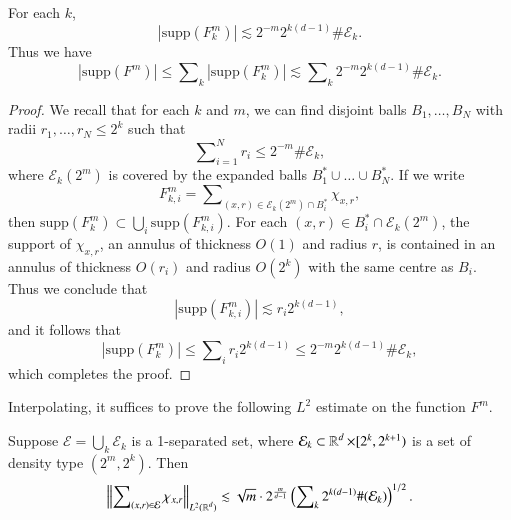 \begin{lemma} \label{lemma5}
    For each $k$,
    \[ |\text{supp}(F^m_k)| \lesssim 2^{-m} 2^{k(d-1)} \# \mathcal{E}_k. \]
    Thus we have
    \[ |\text{supp}(F^m)| \leq \sum\nolimits_k |\text{supp}(F^m_k)| \lesssim \sum\nolimits_k 2^{-m} 2^{k(d-1)} \# \mathcal{E}_k. \]
\end{lemma}
\begin{proof}
    We recall that for each $k$ and $m$, we can find disjoint balls $B_1,\dots,B_N$ with radii $r_1,\dots,r_N \leq 2^k$ such that
    \begin{equation}
      \sum\nolimits_{i = 1}^N r_i \leq 2^{-m} \# \mathcal{E}_k,
    \end{equation}
    where $\mathcal{E}_k(2^m)$ is covered by the expanded balls $B_1^* \cup \dots \cup B_N^*$. If we write
    \begin{equation}
      F^m_{k,i} = \sum\nolimits_{(x,r) \in \mathcal{E}_k(2^m) \cap B_i^*} \chi_{x,r},
    \end{equation}
    then $\text{supp}(F^m_k) \subset \bigcup_i \text{supp}(F^m_{k,i})$. For each $(x,r) \in B_i^* \cap \mathcal{E}_k(2^m)$, the support of $\chi_{x,r}$, an annulus of thickness $O(1)$ and radius $r$, is contained in an annulus of thickness $O(r_i)$ and radius $O(2^k)$ with the same centre as $B_i$. Thus we conclude that
    \begin{equation}
      |\text{supp}(F^m_{k,i})| \lesssim r_i 2^{k(d-1)},
    \end{equation}
    and it follows that
    \begin{equation}
      |\text{supp}(F^m_k)| \leq \sum\nolimits_i r_i 2^{k(d-1)} \leq 2^{-m} 2^{k(d-1)} \# \mathcal{E}_k,
    \end{equation}
    which completes the proof.
\end{proof}

Interpolating, it suffices to prove the following $L^2$ estimate on the function $F^m$.

\begin{lemma} \label{lemma6}
    Suppose $\mathcal{E} = \bigcup_k \mathcal{E}_k$ is a 1-separated set, where $\mathcal{E}_k \subset \operatorname{\mathbb{R}}^d \times [2^k,2^{k+1})$ is a set of density type $(2^m, 2^k)$. Then
    \[ \left\| \sum\nolimits_{(x,r) \in \mathcal{E}} \chi_{x,r} \right\|_{L^2(\operatorname{\mathbb{R}}^d)} \lesssim \sqrt{m} \cdot 2^{ \frac{m}{d-1} } \left( \sum\nolimits_k 2^{k(d-1)} \#(\mathcal{E}_k) \right)^{1/2}. \]
\end{lemma}

